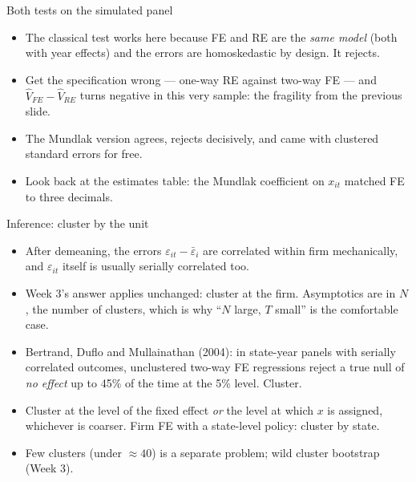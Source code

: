 \documentclass[aspectratio=169,11pt]{beamer}
\begin{document}
\begin{frame}{Both tests on the simulated panel}
\begin{center}

\end{center}
\medskip
\begin{itemize}
	\item The classical test works here because FE and RE are the \emph{same model} (both with year effects)
	and the errors are homoskedastic by design. It rejects.
	\item Get the specification wrong --- one-way RE against two-way FE --- and $\hat V_{FE} - \hat V_{RE}$
	turns negative in this very sample: the fragility from the previous slide.
	\item The Mundlak version agrees, rejects decisively, and came with clustered
	standard errors for free.
	\item Look back at the estimates table: the Mundlak coefficient on $x_{it}$ matched FE to three decimals.
\end{itemize}
\end{frame}


\begin{frame}{Inference: cluster by the unit}
\begin{itemize}
	\item After demeaning, the errors $\varepsilon_{it} - \bar\varepsilon_i$ are correlated within
	firm mechanically, and $\varepsilon_{it}$ itself is usually serially correlated too.
	\medskip
	\item Week 3's answer applies unchanged: cluster at the firm. Asymptotics are in $N$, the number of
	clusters, which is why ``$N$ large, $T$ small'' is the comfortable case.
	\medskip
	\item Bertrand, Duflo and Mullainathan (2004): in state-year panels with serially correlated
	outcomes, unclustered two-way FE regressions reject a true null of \emph{no effect} up to 45\% of the
	time at the 5\% level. Cluster.
	\medskip
	\item Cluster at the level of the fixed effect \emph{or} the level at which $x$ is assigned,
	whichever is coarser. Firm FE with a state-level policy: cluster by state.
	\medskip
	\item Few clusters (under $\approx 40$) is a separate problem; wild cluster bootstrap (Week 3).
\end{itemize}
\end{frame}
\end{document}
